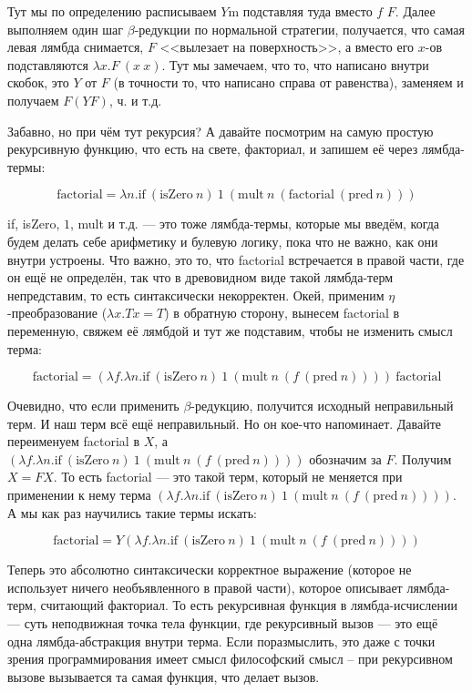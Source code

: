 \documentclass[a5paper]{article}
\begin{document}
Тут мы по определению расписываем $Y$m подставляя туда вместо $f$ $F$. Далее выполняем один шаг $\beta$-редукции по нормальной стратегии, получается, что самая левая лямбда снимается, $F$ <<вылезает на поверхность>>, а вместо его $x$-ов подставляются $\lambda x.F\ (x\ x)$. Тут мы замечаем, что то, что написано внутри скобок, это $Y$ от $F$ (в точности то, что написано справа от равенства), заменяем и получаем $F (Y F)$, ч. и т.д.

Забавно, но при чём тут рекурсия? А давайте посмотрим на самую простую рекурсивную функцию, что есть на свете, факториал, и запишем её через лямбда-термы:

$$\mbox{factorial} = \lambda n. \mbox{if}\ (\mbox{isZero}\ n)\ 1\ (\mbox{mult}\ n\ (\mbox{factorial}\ (\mbox{pred}\ n)))$$

if, isZero, $1$, mult и т.д. --- это тоже лямбда-термы, которые мы введём, когда будем делать себе арифметику и булевую логику, пока что не важно, как они внутри устроены. Что важно, это то, что factorial встречается в правой части, где он ещё не определён, так что в древовидном виде такой лямбда-терм непредставим, то есть синтаксически некорректен. Окей, применим $\eta$-преобразование ($\lambda x. T x = T$) в обратную сторону, вынесем factorial в переменную, свяжем её лямбдой и тут же подставим, чтобы не изменить смысл терма:

$$\mbox{factorial} = (\lambda f.\lambda n.\mbox{if}\ (\mbox{isZero}\ n)\ 1\ (\mbox{mult}\ n\ (f\ (\mbox{pred}\ n))))\ \mbox{factorial}$$

Очевидно, что если применить $\beta$-редукцию, получится исходный неправильный терм. И наш терм всё ещё неправильный. Но он кое-что напоминает. Давайте переименуем factorial в $X$, а $(\lambda f.\lambda n.\mbox{if}\ (\mbox{isZero}\ n)\ 1\ (\mbox{mult}\ n\ (f\ (\mbox{pred}\ n))))$ обозначим за $F$. Получим $X = F X$. То есть factorial --- это такой терм, который не меняется при применении к нему терма $(\lambda f.\lambda n.\mbox{if}\ (\mbox{isZero}\ n)\ 1\ (\mbox{mult}\ n\ (f\ (\mbox{pred}\ n))))$. А мы как раз научились такие термы искать:

$$\mbox{factorial} = Y (\lambda f.\lambda n.\mbox{if}\ (\mbox{isZero}\ n)\ 1\ (\mbox{mult}\ n\ (f\ (\mbox{pred}\ n))))$$

Теперь это абсолютно синтаксически корректное выражение (которое не использует ничего необъявленного в правой части), которое описывает лямбда-терм, считающий факториал. То есть рекурсивная функция в лямбда-исчислении --- суть неподвижная точка тела функции, где рекурсивный вызов --- это ещё одна лямбда-абстракция внутри терма. Если поразмыслить, это даже с точки зрения программирования имеет смысл философский смысл -- при рекурсивном вызове вызывается та самая функция, что делает вызов.
\end{document}
